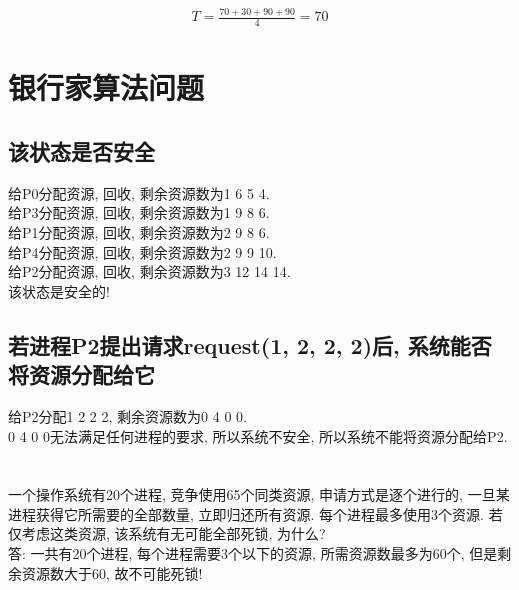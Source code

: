 \documentclass[a4paper, 12pt, notitlepage]{article}
\begin{document}
\begin{align*}
	T = \frac{70 + 30 + 90 + 90}{4} = 70
\end{align*}

\section{银行家算法问题}

\subsection{该状态是否安全}

	给P0分配资源, 回收, 剩余资源数为1 6 5 4. \\
	
	给P3分配资源, 回收, 剩余资源数为1 9 8 6. \\
	
	给P1分配资源, 回收, 剩余资源数为2 9 8 6. \\
	
	给P4分配资源, 回收, 剩余资源数为2 9 9 10. \\
	
	给P2分配资源, 回收, 剩余资源数为3 12 14 14. \\
	
	该状态是安全的!

\subsection{若进程P2提出请求request(1, 2, 2, 2)后, 系统能否将资源分配给它}

	给P2分配1 2 2 2, 剩余资源数为0 4 0 0. \\
	
	0 4 0 0无法满足任何进程的要求, 所以系统不安全, 所以系统不能将资源分配给P2.

\section{ }

	一个操作系统有20个进程, 竞争使用65个同类资源, 申请方式是逐个进行的, 一旦某进程获得它所需要的全部数量, 立即归还所有资源. 每个进程最多使用3个资源. 若仅考虑这类资源, 该系统有无可能全部死锁, 为什么? \\
	
	答: 一共有20个进程, 每个进程需要3个以下的资源, 所需资源数最多为60个, 但是剩余资源数大于60, 故不可能死锁!
	
\section{ }
\end{document}
